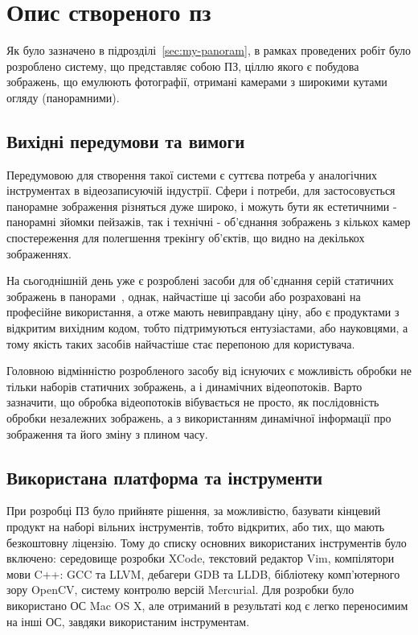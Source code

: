 \chapter{Опис створеного пз}
\label{sec:software}
Як було зазначено в підрозділі~\ref{sec:my-panoram}, в рамках проведених робіт було розроблено систему, що представляє собою ПЗ, ціллю якого є побудова зображень, що емулюють фотографії, отримані камерами з широкими кутами огляду (панорамними). 


\section{Вихідні передумови та вимоги}

Передумовою для створення такої системи є суттєва потреба у аналогічних інструментах в відеозаписуючій індустрії. Сфери і потреби, для застосовується панорамне зображення різняться дуже широко, і можуть бути як естетичними - панорамні зйомки пейзажів, так і технічні - об'єднання зображень з кількох камер спостереження для полегшення трекінгу об'єктів, що видно на декількох зображеннях. 

На сьогоднішній день уже є розроблені засоби для об'єднання серій статичних зображень в панорами~\cite{Brown:2007fk}, однак, найчастіше ці засоби або розраховані на професійне використання, а отже мають невиправдану ціну, або є продуктами з відкритим вихідним кодом, тобто підтримуються ентузіастами, або науковцями, а тому якість таких засобів найчастіше стає перепоною для користувача. 

Головною відмінністю розробленого засобу від існуючих є можливість обробки не тільки наборів статичних зображень, а і динамічних відеопотоків. Варто зазначити, що обробка відеопотоків вібувається не просто, як послідовність обробки незалежних зображень, а з використанням динамічної інформації про зображення та його зміну з плином часу.

\section{Використана платформа та інструменти}

При розробці ПЗ було прийняте рішення, за можливістю, базувати кінцевий продукт на наборі вільних інструментів, тобто відкритих, або тих, що мають безкоштовну ліцензію. Тому до списку основних використаних інструментів було включено: середовище розробки XCode, текстовий редактор Vim, компілятори мови C++: GCC та LLVM, дебагери GDB та LLDB, бібліотеку комп'ютерного зору OpenCV, систему контролю версій Mercurial. Для розробки було використано ОС Mac OS X, але отриманий в результаті код є легко переносимим на інші ОС, завдяки використаним інструментам. 

